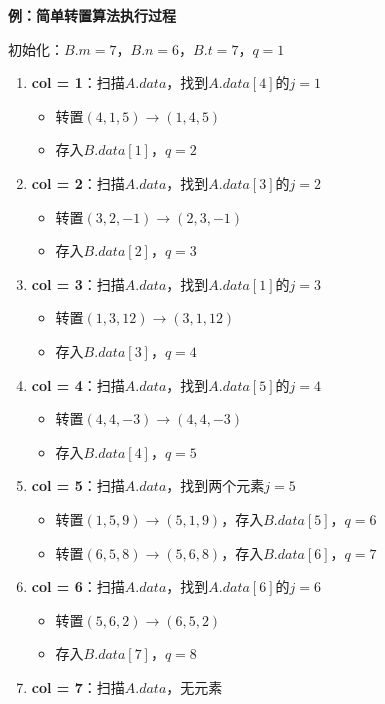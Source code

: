 \documentclass[12pt,a4paper]{amsart}
\begin{document}
\textbf{例：简单转置算法执行过程}

初始化：$B.m = 7$，$B.n = 6$，$B.t = 7$，$q = 1$

\begin{enumerate}
\item \textbf{col = 1}：扫描$A.data$，找到$A.data[4]$的$j=1$
    \begin{itemize}
    \item 转置$(4, 1, 5) \rightarrow (1, 4, 5)$
    \item 存入$B.data[1]$，$q = 2$
    \end{itemize}

\item \textbf{col = 2}：扫描$A.data$，找到$A.data[3]$的$j=2$
    \begin{itemize}
    \item 转置$(3, 2, -1) \rightarrow (2, 3, -1)$
    \item 存入$B.data[2]$，$q = 3$
    \end{itemize}

\item \textbf{col = 3}：扫描$A.data$，找到$A.data[1]$的$j=3$
    \begin{itemize}
    \item 转置$(1, 3, 12) \rightarrow (3, 1, 12)$
    \item 存入$B.data[3]$，$q = 4$
    \end{itemize}

\item \textbf{col = 4}：扫描$A.data$，找到$A.data[5]$的$j=4$
    \begin{itemize}
    \item 转置$(4, 4, -3) \rightarrow (4, 4, -3)$
    \item 存入$B.data[4]$，$q = 5$
    \end{itemize}

\item \textbf{col = 5}：扫描$A.data$，找到两个元素$j=5$
    \begin{itemize}
    \item 转置$(1, 5, 9) \rightarrow (5, 1, 9)$，存入$B.data[5]$，$q = 6$
    \item 转置$(6, 5, 8) \rightarrow (5, 6, 8)$，存入$B.data[6]$，$q = 7$
    \end{itemize}

\item \textbf{col = 6}：扫描$A.data$，找到$A.data[6]$的$j=6$
    \begin{itemize}
    \item 转置$(5, 6, 2) \rightarrow (6, 5, 2)$
    \item 存入$B.data[7]$，$q = 8$
    \end{itemize}

\item \textbf{col = 7}：扫描$A.data$，无元素
\end{enumerate}
\end{document}
